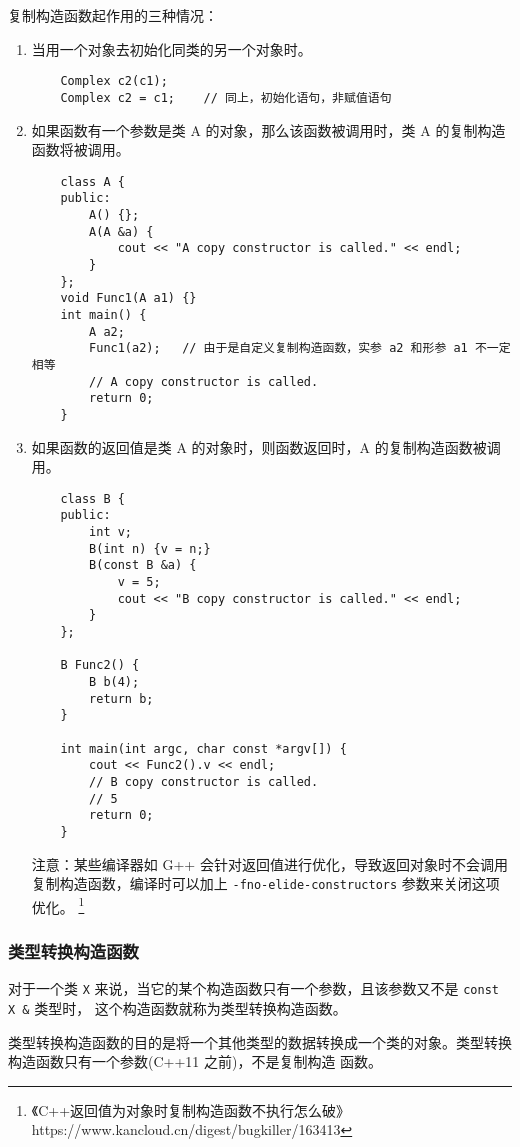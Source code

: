 \documentclass[UTF8]{ctexart}
\begin{document}
复制构造函数起作用的三种情况：
\begin{enumerate}
    \item 当用一个对象去初始化同类的另一个对象时。
    \begin{verbatim}
    Complex c2(c1);
    Complex c2 = c1;    // 同上，初始化语句，非赋值语句
    \end{verbatim}
    \item 如果函数有一个参数是类 A 的对象，那么该函数被调用时，类 A 的复制构造函数将被调用。
    \begin{verbatim}
    class A {
    public:
        A() {};
        A(A &a) {
            cout << "A copy constructor is called." << endl;
        }
    };
    void Func1(A a1) {}
    int main() {
        A a2;
        Func1(a2);   // 由于是自定义复制构造函数，实参 a2 和形参 a1 不一定相等
        // A copy constructor is called.
        return 0;
    }
    \end{verbatim}
    \item 如果函数的返回值是类 A 的对象时，则函数返回时，A 的复制构造函数被调用。
    \begin{verbatim}
    class B {
    public:
        int v;
        B(int n) {v = n;}
        B(const B &a) {
            v = 5;
            cout << "B copy constructor is called." << endl;
        }
    };

    B Func2() {
        B b(4);
        return b;
    }

    int main(int argc, char const *argv[]) {
        cout << Func2().v << endl;
        // B copy constructor is called.
        // 5
        return 0;
    }
    \end{verbatim}
    注意：某些编译器如 G++ 会针对返回值进行优化，导致返回对象时不会调用复制构造函数，编译时可以加上
    \texttt{-fno-elide-constructors} 参数来关闭这项优化。
    \footnote{《C++返回值为对象时复制构造函数不执行怎么破》https://www.kancloud.cn/digest/bugkiller/163413}
\end{enumerate}

\subsubsection{类型转换构造函数}
对于一个类 \texttt{X} 来说，当它的某个构造函数只有一个参数，且该参数又不是 \texttt{const X &} 类型时，
这个构造函数就称为类型转换构造函数。

类型转换构造函数的目的是将一个其他类型的数据转换成一个类的对象。类型转换构造函数只有一个参数(C++11 之前)，不是复制构造
函数。
\end{document}
